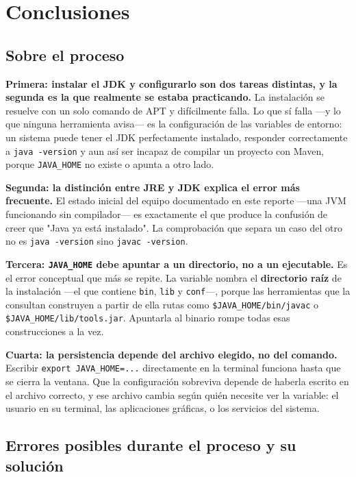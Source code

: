\section{Conclusiones}

\subsection{Sobre el proceso}

\textbf{Primera: instalar el JDK y configurarlo son dos tareas distintas, y la segunda
es la que realmente se estaba practicando.} La instalación se resuelve con un solo
comando de APT y difícilmente falla. Lo que sí falla —y lo que ninguna herramienta
avisa— es la configuración de las variables de entorno: un sistema puede tener el JDK
perfectamente instalado, responder correctamente a \texttt{java -version} y aun así ser
incapaz de compilar un proyecto con Maven, porque \texttt{JAVA\_HOME} no existe o apunta
a otro lado.

\textbf{Segunda: la distinción entre JRE y JDK explica el error más frecuente.} El
estado inicial del equipo documentado en este reporte —una JVM funcionando sin
compilador— es exactamente el que produce la confusión de creer que "Java ya está
instalado". La comprobación que separa un caso del otro no es \texttt{java -version}
sino \texttt{javac -version}.

\textbf{Tercera: \texttt{JAVA\_HOME} debe apuntar a un directorio, no a un ejecutable.}
Es el error conceptual que más se repite. La variable nombra el \textbf{directorio raíz}
de la instalación —el que contiene \texttt{bin}, \texttt{lib} y \texttt{conf}—, porque
las herramientas que la consultan construyen a partir de ella rutas como
\texttt{\$JAVA\_HOME/bin/javac} o \texttt{\$JAVA\_HOME/lib/tools.jar}. Apuntarla al
binario rompe todas esas construcciones a la vez.

\textbf{Cuarta: la persistencia depende del archivo elegido, no del comando.} Escribir
\texttt{export JAVA\_HOME=...} directamente en la terminal funciona hasta que se cierra
la ventana. Que la configuración sobreviva depende de haberla escrito en el archivo
correcto, y ese archivo cambia según quién necesite ver la variable: el usuario en su
terminal, las aplicaciones gráficas, o los servicios del sistema.

\subsection{Errores posibles durante el proceso y su solución}

